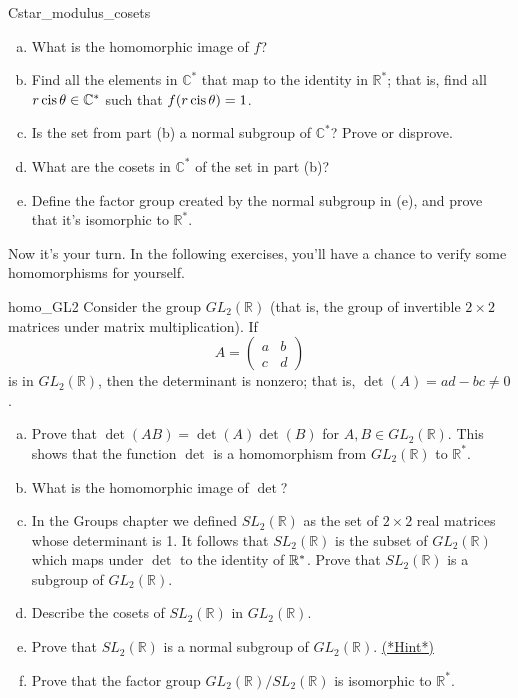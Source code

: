\begin{exercise}{Cstar_modulus_cosets}
\begin{enumerate}[(a)]
\item
What is the homomorphic image of $f$?
\item
Find all the elements in ${\mathbb C}^\ast$ that map  to the identity in ${\mathbb R}^\ast$; that is, find all $r \operatorname{cis} \theta \in {\mathbb C}^\ast$ such that $f(r \operatorname{cis} \theta) = 1$.
\item
Is the set from part (b) a normal subgroup of ${\mathbb C}^\ast$?  Prove or disprove.
\item
What are the cosets in ${\mathbb C}^\ast$ of the set in part (b)?
\item
Define the factor group created by the normal subgroup in (e), and prove that it's isomorphic to  ${\mathbb R}^\ast$.
\end{enumerate}
\end{exercise}
 

Now it's your turn. In the following exercises, you'll have a chance  to verify some homomorphisms for yourself.

\begin{exercise}{homo_GL2}
Consider the group $GL_2( {\mathbb R })$ (that is, the group of invertible $2 \times 2$ matrices under matrix multiplication). If
\[
A=
\begin{pmatrix}
a & b \\
c & d
\end{pmatrix}
\]
is in $GL_2( {\mathbb R })$, then the determinant is  nonzero; that is, $\det(A) = ad -bc
\neq 0$.  

\begin{enumerate}[(a)]
\item
Prove that $\det( AB) = \det(A) \det(B)$ for $A, B \in GL_2( {\mathbb R}
)$. This shows that the function $\det$ is a homomorphism from $ GL_2( {\mathbb R })$ to ${\mathbb R}^\ast$.

\item
What is the homomorphic image of $\det$?
\item
In the Groups chapter we defined $SL_2( {\mathbb R })$ as the set of $2 \times 2$ real matrices whose determinant is 1. It follows that $SL_2( {\mathbb R })$ is the subset of $GL_2( {\mathbb R })$ which maps under $\det$ to the identity of $\mathbb{R}^*$. Prove that $SL_2( {\mathbb R })$ is a subgroup of $GL_2( {\mathbb R })$.
\item
Describe the cosets of $SL_2( {\mathbb R })$ in $GL_2( {\mathbb R })$.
\item
Prove that $SL_2( {\mathbb R })$ is a normal subgroup of $GL_2( {\mathbb R })$. 
\hyperref[sec:homomorph:hints]{(*Hint*)} 
\item
Prove that the factor group $GL_2( {\mathbb R }) / SL_2( {\mathbb R })$ is isomorphic to ${\mathbb R}^\ast$.
\end{enumerate}  
\end{exercise}


